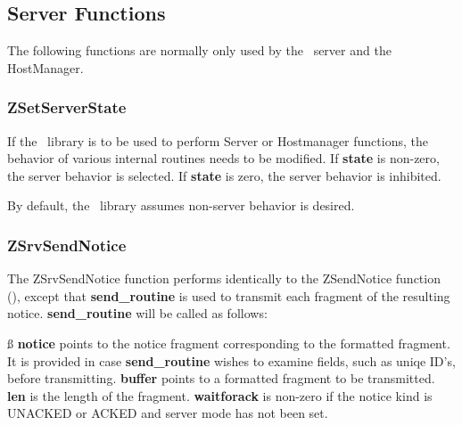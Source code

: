 %
\subsection{Server Functions}
\label{server-functions}

The following functions are normally only used by the \Zephyr\ server
and the HostManager.

\subsubsection{ZSetServerState}
\label{ZSetServerState}

\etemplate
{}

If the \Zephyr\ library is to be used to perform Server or Hostmanager
functions, the behavior of various internal routines needs to be
modified.  If {\bf state} is non-zero, the server behavior is selected.
If {\bf state} is zero, the server behavior is inhibited.

By default, the \Zephyr\ library assumes non-server behavior is desired.

\subsubsection{ZSrvSendNotice}
\label{ZSrvSendNotice}

\etemplate
{}

The ZSrvSendNotice function performs identically to the ZSendNotice
function (), except that {\bf send_routine} is used
to transmit each fragment of the resulting notice.  {\bf send_routine}
will be called as follows:
\par\ss
{}
\nwetemplate\ess
{\bf notice} points to the notice fragment corresponding to the
formatted fragment. It is provided in case {\bf send_routine} wishes to
examine fields, such as uniqe ID's, before transmitting.
{\bf buffer} points to a formatted fragment to be transmitted.
{\bf len} is the length of the fragment.
{\bf waitforack} is non-zero if the notice kind is UNACKED or ACKED and
server mode has not been set.

